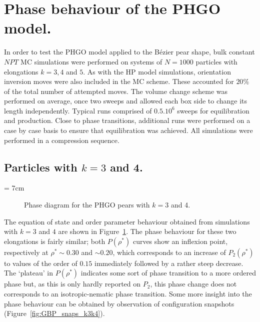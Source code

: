 


\section{Phase behaviour of the PHGO model.}


In order to test the PHGO model applied to the B\'ezier pear shape, bulk constant $NPT$ MC simulations
were performed on systems of $N=1000$ particles with elongations $k=3,4$ and $5$. 
As with the HP model simulations, orientation inversion moves were also included in the MC scheme. 
These accounted for $20\%$ of the total number of attempted moves. The volume change scheme was 
performed on average, once two sweeps and allowed each box side to change its length independently. 
Typical runs comprised of $0.5.10^6$ sweeps for equilibration and production. Close to phase
transitions, 
additional runs were performed on a case by case basis  to ensure that equilibration was
achieved.  All simulations were performed in a compression sequence.


\subsection{Particles with $k=3$ and 4.}


\picW = 7cm
\begin{figure}
	\caption{Phase diagram for the PHGO pears with $k=3$ and 4.}
	\label{fig:PHGO_phaseDia_k3k4}
\end{figure}

The equation of state and order parameter behaviour obtained from simulations with $k=3$ 
and $4$ are shown in 
Figure~\ref{fig:PHGO_phaseDia_k3k4}. The phase behaviour for these two elongations is fairly
similar; both $P(\rho^{*})$ curves show an inflexion point, respectively at $\rho^{*}\sim 0.30$ and
$\sim 0.20$, which corresponds to an increase of $P_2(\rho^{*})$ to values of the order
of $0.15$ immediately followed by a rather steep decrease.\\ 
The `plateau' in $P(\rho^{*})$ indicates some sort of phase transition to a more ordered phase
but, as this is only hardly reported on $P_2$, this phase change does not corresponds to 
an isotropic-nematic phase transition.
Some more insight into the phase behaviour can be obtained by observation of configuration
snapshots (\eg Figure~\ref{fig:GBP_snaps_k3k4}).

